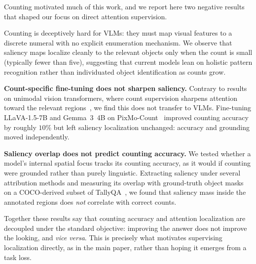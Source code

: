 Counting motivated much of this work, and we report here two negative results that shaped our focus on direct attention supervision.

Counting is deceptively hard for VLMs: they must map visual features to a discrete numeral with no explicit enumeration mechanism. We observe that saliency maps localize cleanly to the relevant objects only when the count is small (typically fewer than five), suggesting that current models lean on holistic pattern recognition rather than individuated object identification as counts grow.

\textbf{Count-specific fine-tuning does not sharpen saliency.} Contrary to results on unimodal vision transformers, where count supervision sharpens attention toward the relevant regions~\citep{paiss2023teaching}, we find this does not transfer to VLMs. Fine-tuning LLaVA-1.5-7B and Gemma~3~4B on PixMo-Count~\citep{deitke2024molmopixmoopenweights} improved counting accuracy by roughly $10\%$ but left saliency localization unchanged: accuracy and grounding moved independently.

\textbf{Saliency overlap does not predict counting accuracy.} We tested whether a model's internal spatial focus tracks its counting accuracy, as it would if counting were grounded rather than purely linguistic. Extracting saliency under several attribution methods and measuring its overlap with ground-truth object masks on a COCO-derived subset of TallyQA~\citep{acharya2019tallyqa}, we found that saliency mass inside the annotated regions does \emph{not} correlate with correct counts.

Together these results say that counting accuracy and attention localization are decoupled under the standard objective: improving the answer does not improve the looking, and \emph{vice versa}. This is precisely what motivates supervising localization directly, as in the main paper, rather than hoping it emerges from a task loss.
